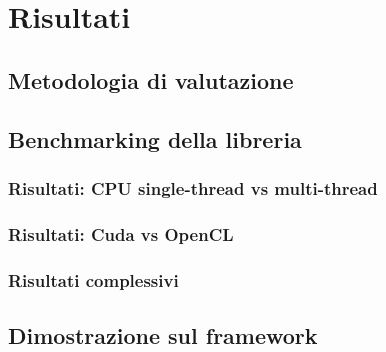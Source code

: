 \chapter{Risultati}
\label{ch:risultati}

\section{Metodologia di valutazione}
\label{sec:bencharmking}

\lipsum[1]

\section{Benchmarking della libreria}
\label{sec:benchmarking}

\lipsum[1]

\subsection{Risultati: CPU single-thread vs multi-thread}
\label{subsec:risultati-cpu}

\lipsum[1]

\subsection{Risultati: Cuda vs OpenCL}
\label{subsec:risultati-cuda-opencl}

\lipsum[1]

\subsection{Risultati complessivi}
\label{subsec:risultati-complessivi}

\lipsum[1]

\section{Dimostrazione sul framework}
\label{sec:dimostrazione}

\lipsum[1]